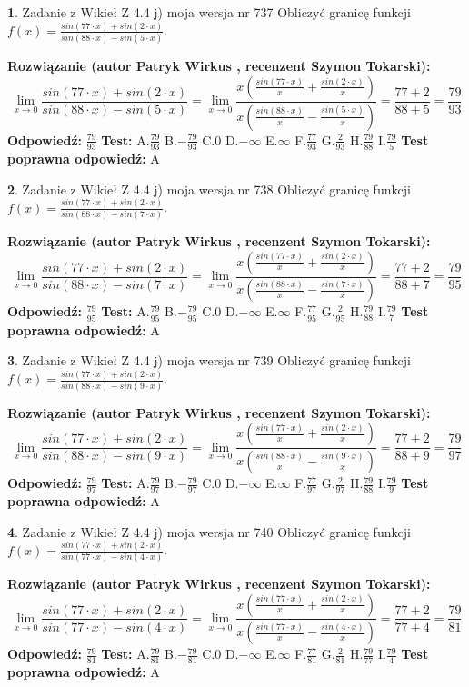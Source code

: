 \documentclass[12pt, a4paper]{article}
\theoremstyle{definition} %
\newtheorem{zad}{}
\newcommand{\zadStart}[1]{\begin{zad}#1\newline}
\newcommand{\zadStop}{\end{zad}}
\newcommand{\rozwStart}[2]{\noindent \textbf{Rozwiązanie (autor #1 , recenzent #2): }\newline}
\newcommand{\rozwStop}{\newline}
\newcommand{\odpStart}{\noindent \textbf{Odpowiedź:}\newline}
\newcommand{\odpStop}{\newline}
\newcommand{\testStart}{\noindent \textbf{Test:}\newline}
\newcommand{\testStop}{\newline}
\newcommand{\kluczStart}{\noindent \textbf{Test poprawna odpowiedź:}\newline}
\newcommand{\kluczStop}{\newline}
\begin{document}
\zadStart{Zadanie z Wikieł Z 4.4 j) moja wersja nr 737}
Obliczyć granicę funkcji $f(x)=\frac{sin(77\cdot x) +sin(2\cdot x)}{sin(88\cdot x) -sin(5\cdot x)}$.
\zadStop
\rozwStart{Patryk Wirkus}{Szymon Tokarski}
$$\lim\limits_{x\to 0}\frac{sin(77\cdot x) +sin(2\cdot x)}{sin(88\cdot x) -sin(5\cdot x)}=\lim\limits_{x\to 0}\frac{x(\frac{sin(77\cdot x)}{x}+\frac{sin(2\cdot x)}{x})}{x(\frac{sin(88\cdot x)}{x}-\frac{sin(5\cdot x)}{x})}=\frac{77+2}{88+5} = \frac{79}{93}$$
\rozwStop
\odpStart
$\frac{79}{93}$
\odpStop
\testStart
A.$\frac{79}{93}$
B.$-\frac{79}{93}$
C.$0$
D.$-\infty$
E.$\infty$
F.$\frac{77}{93}$
G.$\frac{2}{93}$
H.$\frac{79}{88}$
I.$\frac{79}{5}$
\testStop
\kluczStart
A
\kluczStop



\zadStart{Zadanie z Wikieł Z 4.4 j) moja wersja nr 738}
Obliczyć granicę funkcji $f(x)=\frac{sin(77\cdot x) +sin(2\cdot x)}{sin(88\cdot x) -sin(7\cdot x)}$.
\zadStop
\rozwStart{Patryk Wirkus}{Szymon Tokarski}
$$\lim\limits_{x\to 0}\frac{sin(77\cdot x) +sin(2\cdot x)}{sin(88\cdot x) -sin(7\cdot x)}=\lim\limits_{x\to 0}\frac{x(\frac{sin(77\cdot x)}{x}+\frac{sin(2\cdot x)}{x})}{x(\frac{sin(88\cdot x)}{x}-\frac{sin(7\cdot x)}{x})}=\frac{77+2}{88+7} = \frac{79}{95}$$
\rozwStop
\odpStart
$\frac{79}{95}$
\odpStop
\testStart
A.$\frac{79}{95}$
B.$-\frac{79}{95}$
C.$0$
D.$-\infty$
E.$\infty$
F.$\frac{77}{95}$
G.$\frac{2}{95}$
H.$\frac{79}{88}$
I.$\frac{79}{7}$
\testStop
\kluczStart
A
\kluczStop



\zadStart{Zadanie z Wikieł Z 4.4 j) moja wersja nr 739}
Obliczyć granicę funkcji $f(x)=\frac{sin(77\cdot x) +sin(2\cdot x)}{sin(88\cdot x) -sin(9\cdot x)}$.
\zadStop
\rozwStart{Patryk Wirkus}{Szymon Tokarski}
$$\lim\limits_{x\to 0}\frac{sin(77\cdot x) +sin(2\cdot x)}{sin(88\cdot x) -sin(9\cdot x)}=\lim\limits_{x\to 0}\frac{x(\frac{sin(77\cdot x)}{x}+\frac{sin(2\cdot x)}{x})}{x(\frac{sin(88\cdot x)}{x}-\frac{sin(9\cdot x)}{x})}=\frac{77+2}{88+9} = \frac{79}{97}$$
\rozwStop
\odpStart
$\frac{79}{97}$
\odpStop
\testStart
A.$\frac{79}{97}$
B.$-\frac{79}{97}$
C.$0$
D.$-\infty$
E.$\infty$
F.$\frac{77}{97}$
G.$\frac{2}{97}$
H.$\frac{79}{88}$
I.$\frac{79}{9}$
\testStop
\kluczStart
A
\kluczStop



\zadStart{Zadanie z Wikieł Z 4.4 j) moja wersja nr 740}
Obliczyć granicę funkcji $f(x)=\frac{sin(77\cdot x) +sin(2\cdot x)}{sin(77\cdot x) -sin(4\cdot x)}$.
\zadStop
\rozwStart{Patryk Wirkus}{Szymon Tokarski}
$$\lim\limits_{x\to 0}\frac{sin(77\cdot x) +sin(2\cdot x)}{sin(77\cdot x) -sin(4\cdot x)}=\lim\limits_{x\to 0}\frac{x(\frac{sin(77\cdot x)}{x}+\frac{sin(2\cdot x)}{x})}{x(\frac{sin(77\cdot x)}{x}-\frac{sin(4\cdot x)}{x})}=\frac{77+2}{77+4} = \frac{79}{81}$$
\rozwStop
\odpStart
$\frac{79}{81}$
\odpStop
\testStart
A.$\frac{79}{81}$
B.$-\frac{79}{81}$
C.$0$
D.$-\infty$
E.$\infty$
F.$\frac{77}{81}$
G.$\frac{2}{81}$
H.$\frac{79}{77}$
I.$\frac{79}{4}$
\testStop
\kluczStart
A
\kluczStop
\end{document}
